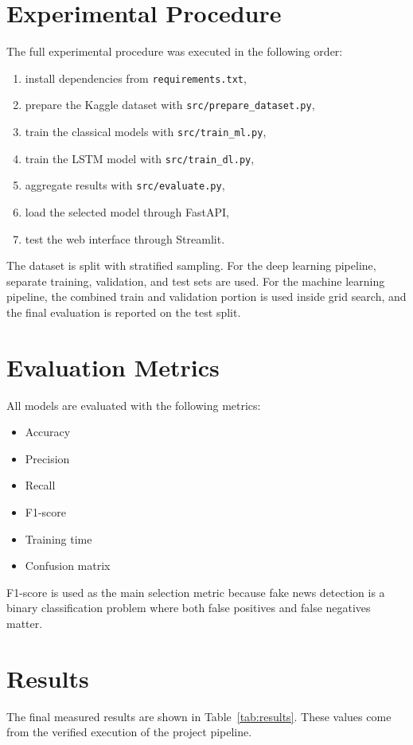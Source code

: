 \documentclass[12pt,a4paper]{article}
\begin{document}
\section{Experimental Procedure}
The full experimental procedure was executed in the following order:
\begin{enumerate}[leftmargin=*]
\item install dependencies from \texttt{requirements.txt},
\item prepare the Kaggle dataset with \texttt{src/prepare\_dataset.py},
\item train the classical models with \texttt{src/train\_ml.py},
\item train the LSTM model with \texttt{src/train\_dl.py},
\item aggregate results with \texttt{src/evaluate.py},
\item load the selected model through FastAPI,
\item test the web interface through Streamlit.
\end{enumerate}

The dataset is split with stratified sampling. For the deep learning pipeline, separate training, validation, and test sets are used. For the machine learning pipeline, the combined train and validation portion is used inside grid search, and the final evaluation is reported on the test split.

\section{Evaluation Metrics}
All models are evaluated with the following metrics:
\begin{itemize}[leftmargin=*]
\item Accuracy
\item Precision
\item Recall
\item F1-score
\item Training time
\item Confusion matrix
\end{itemize}

F1-score is used as the main selection metric because fake news detection is a binary classification problem where both false positives and false negatives matter.

\section{Results}
The final measured results are shown in Table~\ref{tab:results}. These values come from the verified execution of the project pipeline.
\end{document}
